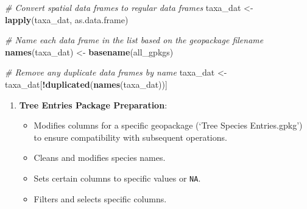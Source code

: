 \documentclass[
]{book}
\newenvironment{Shaded}{\begin{snugshade}}{\end{snugshade}}
\newcommand{\CommentTok}[1]{\textcolor[rgb]{0.56,0.35,0.01}{\textit{#1}}}
\newcommand{\FunctionTok}[1]{\textcolor[rgb]{0.13,0.29,0.53}{\textbf{#1}}}
\newcommand{\NormalTok}[1]{#1}
\newcommand{\OtherTok}[1]{\textcolor[rgb]{0.56,0.35,0.01}{#1}}
\newcommand{\SpecialCharTok}[1]{\textcolor[rgb]{0.81,0.36,0.00}{\textbf{#1}}}
\providecommand{\tightlist}{%
  \setlength{\itemsep}{0pt}\setlength{\parskip}{0pt}}
\begin{document}
\begin{Shaded}
\begin{Highlighting}[]
\CommentTok{\# Convert spatial data frames to regular data frames}
\NormalTok{taxa\_dat }\OtherTok{\textless{}{-}} \FunctionTok{lapply}\NormalTok{(taxa\_dat, as.data.frame)}

\CommentTok{\# Name each data frame in the list based on the geopackage filename}
\FunctionTok{names}\NormalTok{(taxa\_dat) }\OtherTok{\textless{}{-}} \FunctionTok{basename}\NormalTok{(all\_gpkgs)}

\CommentTok{\# Remove any duplicate data frames by name}
\NormalTok{taxa\_dat }\OtherTok{\textless{}{-}}\NormalTok{ taxa\_dat[}\SpecialCharTok{!}\FunctionTok{duplicated}\NormalTok{(}\FunctionTok{names}\NormalTok{(taxa\_dat))]}
\end{Highlighting}
\end{Shaded}

\begin{enumerate}
\def\labelenumi{\arabic{enumi}.}
\setcounter{enumi}{2}
\tightlist
\item
  \textbf{Tree Entries Package Preparation}:

  \begin{itemize}
  \tightlist
  \item
    Modifies columns for a specific geopackage (`Tree Species Entries.gpkg') to ensure compatibility with subsequent operations.
  \item
    Cleans and modifies species names.
  \item
    Sets certain columns to specific values or \texttt{NA}.
  \item
    Filters and selects specific columns.
  \end{itemize}
\end{enumerate}
\end{document}
